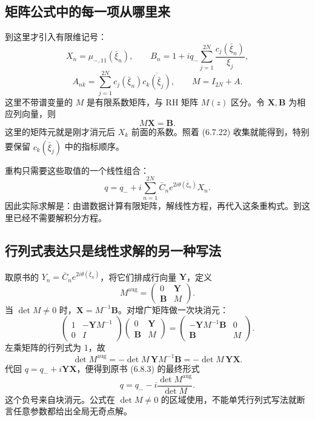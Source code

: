 \documentclass[lang=cn,scheme=chinese,mode=simple,device=normal,color=blue,math=cm,thmcnt=section,12pt]{elegantbook}
\newcommand{\eqq}[2]{\tag{#1}\label{eq:#1}#2}
\begin{document}
\subsection*{矩阵公式中的每一项从哪里来}
到这里才引入有限维记号：
\[
X_n=\mu_{-,11}(\bar\xi_n),\qquad
B_n=1+iq_-\sum\limits_{j=1}^{2N}\dfrac{c_j(\bar\xi_n)}{\xi_j},
\]
\[
A_{nk}=\sum\limits_{j=1}^{2N}c_j(\bar\xi_n)\overline{c_k(\bar\xi_j)},
\qquad M=I_{2N}+A.
\]
这里不带谱变量的 $M$ 是有限系数矩阵，与 RH 矩阵 $M(z)$ 区分。令 $\boldsymbol X,\boldsymbol B$ 为相应列向量，则
\begin{equation}\eqq{6.8.1}{M\boldsymbol X=\boldsymbol B.}\end{equation}
这里的矩阵元就是刚才消元后 $X_k$ 前面的系数。照着 (6.7.22) 收集就能得到，特别要保留 $\overline{c_k(\bar\xi_j)}$ 中的指标顺序。

重构只需要这些取值的一个线性组合：
\begin{equation}\eqq{6.7.17}{q=q_-+
i\sum\limits_{n=1}^{2N}\bar C_ne^{2i\theta(\bar\xi_n)}X_n.}\end{equation}
因此实际求解是：由谱数据计算有限矩阵，解线性方程，再代入这条重构式。到这里已经不需要解积分方程。

\subsection*{行列式表达只是线性求解的另一种写法}
取原书的 $Y_n=\bar C_ne^{2i\theta(\bar\xi_n)}$，将它们排成行向量 $\boldsymbol Y$，定义
\begin{equation}\eqq{6.8.4}{M^{\mathrm{aug}}=
\begin{pmatrix}0&\boldsymbol Y\\ \boldsymbol B&M\end{pmatrix}.}\end{equation}
当 $\det M\ne0$ 时，$\boldsymbol X=M^{-1}\boldsymbol B$。对增广矩阵做一次块消元：
\[
\begin{pmatrix}1&-\boldsymbol YM^{-1}\\0&I\end{pmatrix}
\begin{pmatrix}0&\boldsymbol Y\\\boldsymbol B&M\end{pmatrix}
=\begin{pmatrix}-\boldsymbol YM^{-1}\boldsymbol B&0\\\boldsymbol B&M\end{pmatrix}.
\]
左乘矩阵的行列式为 1，故
\[
\det M^{\mathrm{aug}}
=-\det M\,\boldsymbol YM^{-1}\boldsymbol B
=-\det M\,\boldsymbol Y\boldsymbol X.
\]
代回 $q=q_-+i\boldsymbol Y\boldsymbol X$，便得到原书 (6.8.3) 的最终形式
\[
\boxed{q=q_--i\dfrac{\det M^{\mathrm{aug}}}{\det M}.}
\]
这个负号来自块消元。公式在 $\det M\ne0$ 的区域使用，不能单凭行列式写法就断言任意参数都给出全局无奇点解。
\end{document}
